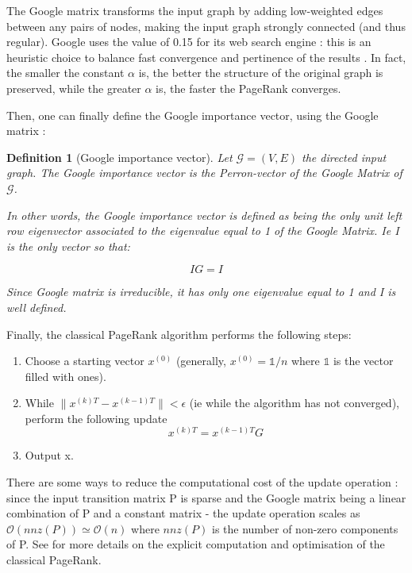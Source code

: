\documentclass[sn-mathphys]{sn-jnl}%
\theoremstyle{thmstyleone}%
\theoremstyle{thmstyletwo}%
\theoremstyle{thmstylethree}%
\newtheorem{definition}[theo]{Definition}
\begin{document}
The Google matrix transforms the input graph by adding low-weighted
edges between any pairs of nodes, making the input graph strongly
connected (and thus regular). Google uses the value of 0.15 for its
web search engine : this is an heuristic choice to balance fast
convergence and pertinence of the results
\cite{langville_meyer_2004}. In fact, the smaller the constant
$\alpha$ is, the better the structure of the original graph is
preserved, while the greater $\alpha$ is, the faster the PageRank
converges.

Then, one can finally define the Google importance vector, using the
Google matrix :
 
\begin{definition}[Google importance vector]
  Let $\mathcal{G}=(V,E)$ the directed input graph. The Google
  importance vector is the Perron-vector of the Google Matrix of
  $\mathcal{G}$.

  In other words, the Google importance vector is defined as being the
  only unit left row eigenvector associated to the eigenvalue equal to 1
  of the Google Matrix. Ie I is the only vector so that:
  
  \begin{equation}
    IG = I
  \end{equation}
  
  Since Google matrix is irreducible, it has only one eigenvalue equal
  to 1 and I is well defined.
  
\end{definition}

Finally, the classical PageRank algorithm performs the following
steps:

\begin{enumerate}
\item Choose a starting vector $x^{(0)}$ (generally,
  $x^{(0)} = \mathbb{1}/n$ where $\mathbb{1}$ is the vector filled
  with ones).
\item While $\|x^{(k)T} - x^{(k-1)T}\| < \epsilon$ (ie while the
  algorithm has not converged), perform the following update
  \begin{equation*}
    x^{(k)T} = x^{(k-1)T} G
  \end{equation*}
\item Output x.
\end{enumerate}

There are some ways to reduce the computational cost of the update
operation : since the input transition matrix P is sparse and the
Google matrix being a linear combination of P and a constant matrix -
the update operation scales as
$\mathcal{O}(nnz(P)) \simeq \mathcal{O} (n)$ where $nnz(P)$ is the
number of non-zero components of P. See \cite{langville_meyer_2004}
for more details on the explicit computation and optimisation of the
classical PageRank.
\end{document}
